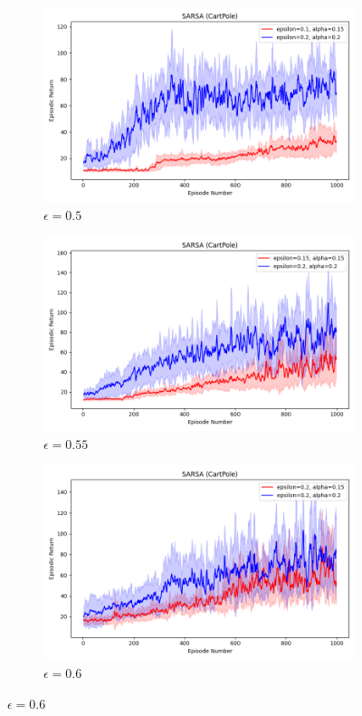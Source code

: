 \documentclass[11pt, a4]{article}
\begin{document}
\begin{figure}[h]
				\vspace{0.1cm}
				
				\begin{subfigure}[h]{0.3\textwidth}
					\centering
					\includegraphics[width=\textwidth]{../plots/sarsa_0.15_0.1vs0.2_0.2.png}
					\caption{$\epsilon = 0.5$}
				\end{subfigure}
				\hfill
				\begin{subfigure}[h]{0.3\textwidth}
					\centering
					\includegraphics[width=\textwidth]{../plots/sarsa_0.15_0.15vs0.2_0.2.png}
					\caption{$\epsilon = 0.55$}
				\end{subfigure}
				\hfill
				\begin{subfigure}[h]{0.3\textwidth}
					\centering
					\includegraphics[width=\textwidth]{../plots/sarsa_0.15_0.2vs0.2_0.2.png}
					\caption{$\epsilon = 0.6$}
				\end{subfigure}
				

\end{figure}
\end{document}
